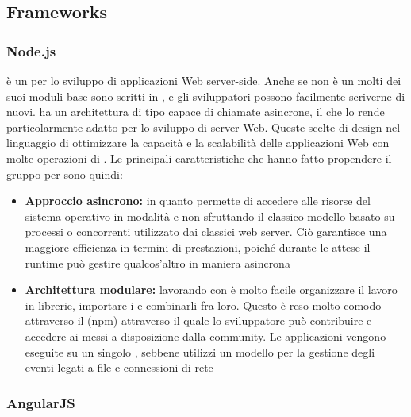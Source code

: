 \documentclass[12pt,a4paper]{article}
\begin{document}
\subsection{Frameworks}
\subsubsection{Node.js}\label{node.js}

 è un   per lo sviluppo di applicazioni Web server-side.
Anche se  non è un   molti dei suoi moduli base  sono scritti in , e gli sviluppatori possono facilmente scriverne di nuovi.
 ha un architettura di tipo  capace di chiamate  asincrone, il che lo rende particolarmente adatto per lo sviluppo di server Web.
Queste scelte di design nel linguaggio di ottimizzare la capacità e la scalabilità delle applicazioni Web con molte operazioni di .
Le principali caratteristiche che hanno fatto propendere il gruppo per  sono quindi:
\begin{itemize}
	\item \textbf{Approccio asincrono:} in quanto permette di accedere alle risorse del sistema operativo in modalità  e non sfruttando il classico modello basato su processi o  concorrenti utilizzato dai classici web server. Ciò garantisce una maggiore efficienza in termini di prestazioni, poiché durante le attese il runtime può gestire qualcos’altro in maniera asincrona
	
	\item \textbf{Architettura modulare:} lavorando con  è molto facile organizzare il lavoro in librerie, importare i  e combinarli fra loro. Questo è reso molto comodo attraverso il  (npm) attraverso il quale lo sviluppatore può contribuire e
	accedere ai  messi a disposizione dalla community.
	Le applicazioni  vengono eseguite su un singolo , sebbene  utilizzi un modello  per la gestione degli eventi legati a file e connessioni di rete
\end{itemize}

\subsubsection{AngularJS}
\TODO{}
\end{document}
